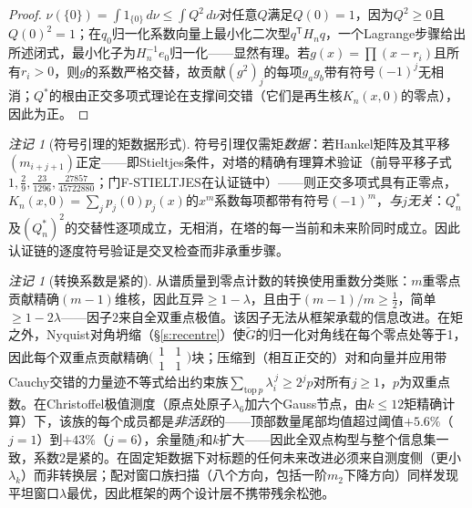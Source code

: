 \documentclass[11pt]{article}
\numberwithin{equation}{section}
\theoremstyle{definition}
\theoremstyle{remark}
\newtheorem{remark}[theorem]{注记}
\begin{document}
\begin{proof}
$\nu(\{0\})=\int1_{\{0\}}\,d\nu\le\int Q^2\,d\nu$对任意$Q$满足$Q(0)=1$，因为$Q^2\ge0$且$Q(0)^2=1$；在$q_0$归一化系数向量上最小化二次型$q^{\mathsf T}H_nq$，一个Lagrange步骤给出所述闭式，最小化子为$H_n^{-1}e_0$归一化——显然有理。若$g(x)=\prod(x-r_i)$且所有$r_i>0$，则$g$的系数严格交替，故贡献$(g^2)_j$的每项$g_ag_b$带有符号$(-1)^j$无相消；$Q^*$的根由正交多项式理论在支撑间交错（它们是再生核$K_n(x,0)$的零点），因此为正。
\end{proof}

\begin{remark}[符号引理的矩数据形式]\label{r:stieltjes}
符号引理仅需矩\emph{数据}：若Hankel矩阵及其平移$(m_{i+j+1})$正定——即Stieltjes条件，对塔的精确有理算术验证（前导平移子式$1,\tfrac29,\tfrac{23}{1296},\tfrac{27857}{45722880}$；门F-STIELTJES在认证链中）——则正交多项式具有正零点，$K_n(x,0)=\sum_jp_j(0)p_j(x)$的$x^m$系数每项都带有符号$(-1)^m$，\emph{与$j$无关}：$Q_n^*$及$(Q_n^*)^2$的交替性逐项成立，无相消，在塔的每一当前和未来阶同时成立。因此认证链的逐度符号验证是交叉检查而非承重步骤。
\end{remark}

\begin{remark}[转换系数是紧的]\label{r:tight2}
从谱质量到零点计数的转换使用重数分类账：$m$重零点贡献精确$(m{-}1)$维核，因此互异$\ge1-\lambda$，且由于$(m-1)/m\ge\tfrac12$，简单$\ge1-2\lambda$——因子$2$来自全双重点极值。该因子无法从框架承载的信息改进。在矩之外，Nyquist对角坍缩（\S\ref{s:recentre}）使$\widetilde G$的归一化对角线在每个零点处等于1，因此每个双重点贡献精确$\bigl(\begin{smallmatrix}1&1\\1&1\end{smallmatrix}\bigr)$块；压缩到（相互正交的）对和向量并应用带Cauchy交错的力量迹不等式给出约束族$\sum_{\mathrm{top}\,p}\lambda_i^{\,j}\ge2^{j}p$对所有$j\ge1$，$p$为双重点数。在Christoffel极值测度（原点处原子$\lambda_6$加六个Gauss节点，由$k\le12$矩精确计算）下，该族的每个成员都是\emph{非活跃}的——顶部数量尾部均值超过阈值$+5.6\%$（$j=1$）到$+43\%$（$j=6$），余量随$j$和$k$扩大——因此全双点构型与整个信息集一致，系数$2$是紧的。在固定矩数据下对标题的任何未来改进必须来自测度侧（更小$\lambda_k$）而非转换层；配对窗口族扫描（八个方向，包括一阶$m_2$下降方向）同样发现平坦窗口$\lambda$最优，因此框架的两个设计层不携带残余松弛。
\end{remark}
\end{document}
